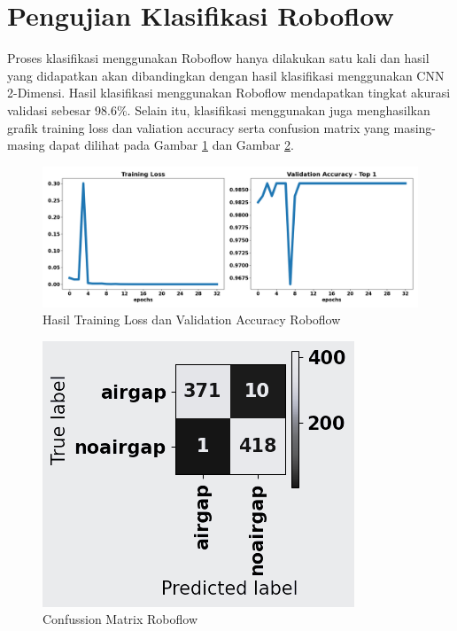 \section{Pengujian Klasifikasi Roboflow}
\label{sec:PengujianRoboflow}
Proses klasifikasi menggunakan Roboflow hanya dilakukan satu kali dan hasil yang didapatkan akan dibandingkan dengan hasil klasifikasi menggunakan CNN 2-Dimensi. Hasil klasifikasi menggunakan Roboflow mendapatkan tingkat akurasi validasi sebesar 98.6\%. Selain itu, klasifikasi menggunakan juga menghasilkan grafik training loss dan valiation accuracy serta confusion matrix yang masing-masing dapat dilihat pada Gambar \ref{fig:roboflow} dan Gambar \ref{fig:confusionrobo}.

\begin{minipage}{\linewidth}
    \begin{figure} [H]
        \centering
        \includegraphics[scale=0.3]{gambar/bab4/roboflow.png}
        \caption{Hasil Training Loss dan Validation Accuracy Roboflow}
        \label{fig:roboflow}
    \end{figure}
\end{minipage}

\begin{minipage}{\linewidth}
    \begin{figure} [H]
        \centering
        \includegraphics[scale=1]{gambar/bab4/confusion.png}
        \caption{Confussion Matrix Roboflow}
        \label{fig:confusionrobo}
    \end{figure}
\end{minipage}

